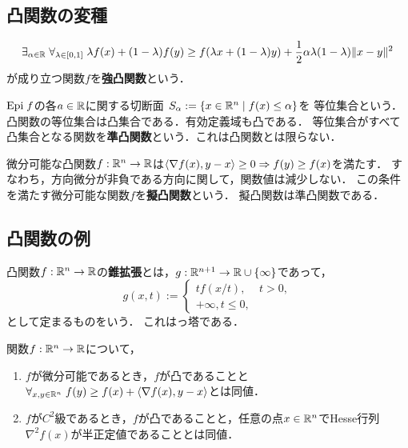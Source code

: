 \documentclass[uplatex,dvipdfmx]{jsreport}
\begin{document}
\subsection{凸関数の変種}

\begin{definition}
    \[\exists_{\alpha\in\mathbb{R}}\;\forall_{\lambda\in[0,1]}\;\lambda f(x)+(1-\lambda)f(y)\ge f(\lambda x+(1-\lambda)y)+\frac{1}{2}\alpha\lambda(1-\lambda)\|x-y\|^2\]が成り立つ関数$f$を\textbf{強凸関数}という．
\end{definition}

\begin{definition}\label{def-level-set}
    $\mathrm{Epi}\; f$の各$a\in\mathbb{R}$に関する切断面
    $S_\alpha:=\left\{x\in\mathbb{R}^n\mid f(x)\le\alpha\right\}$を
    等位集合という．凸関数の等位集合は凸集合である．有効定義域も凸である．
    等位集合がすべて凸集合となる関数を\textbf{準凸関数}という．これは凸関数とは限らない．
\end{definition}

\begin{definition}
    微分可能な凸関数$f:\mathbb{R}^n\to\mathbb{R}$は$\langle\nabla f(x),y-x\rangle\ge0\Rightarrow f(y)\ge f(x)$を満たす．
    すなわち，方向微分が非負である方向に関して，関数値は減少しない．
    この条件を満たす微分可能な関数$f$を\textbf{擬凸関数}という．
    擬凸関数は準凸関数である．
\end{definition}

\subsection{凸関数の例}

\begin{example}[perspective]
    凸関数$f:\mathbb{R}^n\to\mathbb{R}$の\textbf{錐拡張}とは，$g:\mathbb{R}^{n+1}\to\mathbb{R}\cup\{\infty\}$であって，
    \[g(x,t):=\begin{cases}
        tf(x/t),&t>0,\\
        +\infty,t\le0,
    \end{cases}\]
    として定まるものをいう．
    これはっ塔である．
\end{example}

\begin{corollary}
    関数$f:\mathbb{R}^n\to\mathbb{R}$について，
    \begin{enumerate}
        \item $f$が微分可能であるとき，$f$が凸であることと$\forall_{x,y\in\mathbb{R}^n}\;f(y)\ge f(x)+\langle\nabla f(x),y-x\rangle$とは同値．
        \item $f$が$C^2$級であるとき，$f$が凸であることと，任意の点$x\in\mathbb{R}^n$でHesse行列$\nabla^2f(x)$が半正定値であることとは同値．
    \end{enumerate}
\end{corollary}
\end{document}
